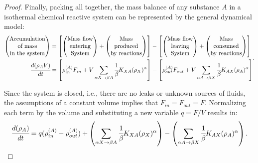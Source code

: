 \documentclass[a4paper,11pt]{book}
\numberwithin{figure}{chapter}
\numberwithin{equation}{chapter}
\numberwithin{table}{chapter}
\theoremstyle{definition}
\begin{document}
\begin{proof}
    Finally, packing all together, the mass balance of any substance $A$ in a isothermal chemical reactive system can be represented by the general dynamical model:
    \begin{equation}
    \begin{split}
        \begin{pmatrix}
        \text{Accumulation} \\ \text{of mass} \\ \text{in the system}
    \end{pmatrix} &= \left[ \begin{pmatrix}
        \text{Mass flow} \\ \text{entering} \\ \text{System}
    \end{pmatrix} + \begin{pmatrix}
        \text{Mass} \\  \text{produced} \\ \text{by reactions}
    \end{pmatrix} \right] - \left[ \begin{pmatrix}
        \text{Mass flow} \\ \text{leaving} \\ \text{System}
    \end{pmatrix} + \begin{pmatrix}
        \text{Mass} \\ \text{consumed} \\ \text{by reactions}
    \end{pmatrix} \right] \\
        \cfrac{d (\rho_A V)}{dt} &= \left[ \rho^{(A)}_{in} F_{in} + V \sum_{\alpha X \rightarrow \beta A} \cfrac{1}{\beta} K_{XA} (\rho_X)^{\alpha} \right] - \left[ \rho^{(A)}_{out} F_{out} + V \sum_{\alpha A \rightarrow \beta X} \cfrac{1}{\beta} K_{AX} (\rho_A)^{\alpha} \right]
    \end{split}
    .\end{equation}
    
    Since the system is closed, i.e., there are no leaks or unknown sources of fluids, the assumptions of a constant volume implies that $F_{in} = F_{out} = F$. Normalizing each term by the volume and substituting a new variable $q = F/V$ results in:
    \begin{equation} \label{eq:isoModel3}
            \cfrac{d (\rho_A)}{dt} = q (\rho^{(A)}_{in} - \rho^{(A)}_{out}) + \left( \sum_{\alpha X \rightarrow \beta A} \cfrac{1}{\beta} K_{XA} (\rho_X)^{\alpha} \right) - \left(\sum_{\alpha A \rightarrow \beta X} \cfrac{1}{\beta} K_{AX} (\rho_A)^{\alpha} \right)
    .\end{equation}
\end{proof}
\end{document}
